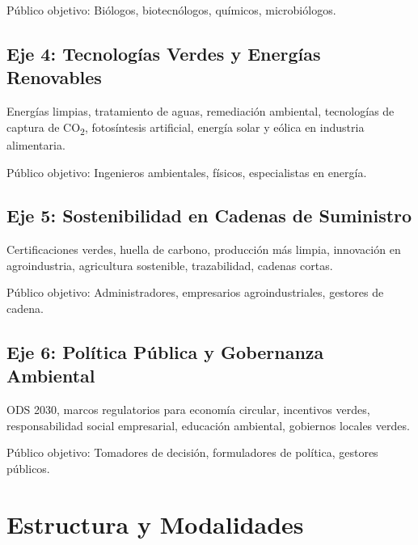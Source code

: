 \documentclass[12pt,a4paper]{article}
\begin{document}
Público objetivo: Biólogos, biotecnólogos, químicos, microbiólogos.

\subsection{Eje 4: Tecnologías Verdes y Energías Renovables}

\begin{tcolorbox}[cajainfo, title=Tópicos principales]
Energías limpias, tratamiento de aguas, remediación ambiental, tecnologías de captura de CO\textsubscript{2}, fotosíntesis artificial, energía solar y eólica en industria alimentaria.
\end{tcolorbox}

Público objetivo: Ingenieros ambientales, físicos, especialistas en energía.

\subsection{Eje 5: Sostenibilidad en Cadenas de Suministro}

\begin{tcolorbox}[cajainfo, title=Tópicos principales]
Certificaciones verdes, huella de carbono, producción más limpia, innovación en agroindustria, agricultura sostenible, trazabilidad, cadenas cortas.
\end{tcolorbox}

Público objetivo: Administradores, empresarios agroindustriales, gestores de cadena.

\subsection{Eje 6: Política Pública y Gobernanza Ambiental}

\begin{tcolorbox}[cajainfo, title=Tópicos principales]
ODS 2030, marcos regulatorios para economía circular, incentivos verdes, responsabilidad social empresarial, educación ambiental, gobiernos locales verdes.
\end{tcolorbox}

Público objetivo: Tomadores de decisión, formuladores de política, gestores públicos.

\section{Estructura y Modalidades}
\end{document}

